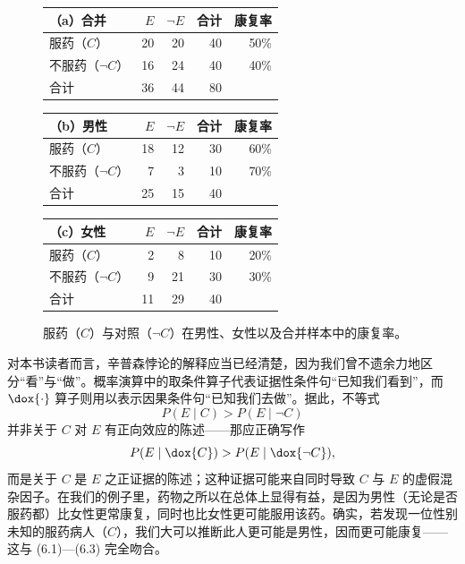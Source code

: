 \begin{figure}[htbp]
\centering
\begin{tabular}{@{}p{3.35cm} r r r r@{}}
\toprule
\textbf{（a）合并} & $E$ & $\neg E$ & 合计 & 康复率\\
\midrule
服药（$C$） & 20 & 20 & 40 & 50\%\\
不服药（$\neg C$） & 16 & 24 & 40 & 40\%\\
\midrule
合计 & 36 & 44 & 80 & \\
\bottomrule
\end{tabular}

\par\vspace{2.0em}
\begin{tabular}{@{}p{3.35cm} r r r r@{}}
\toprule
\textbf{（b）男性} & $E$ & $\neg E$ & 合计 & 康复率\\
\midrule
服药（$C$） & 18 & 12 & 30 & 60\%\\
不服药（$\neg C$） & 7 & 3 & 10 & 70\%\\
\midrule
合计 & 25 & 15 & 40 & \\
\bottomrule
\end{tabular}

\par\vspace{2.0em}
\begin{tabular}{@{}p{3.35cm} r r r r@{}}
\toprule
\textbf{（c）女性} & $E$ & $\neg E$ & 合计 & 康复率\\
\midrule
服药（$C$） & 2 & 8 & 10 & 20\%\\
不服药（$\neg C$） & 9 & 21 & 30 & 30\%\\
\midrule
合计 & 11 & 29 & 40 & \\
\bottomrule
\end{tabular}
\caption{服药（$C$）与对照（$\neg C$）在男性、女性以及合并样本中的康复率。}
\label{fig:6.1}
\end{figure}

对本书读者而言，辛普森悖论的解释应当已经清楚，因为我们曾不遗余力地区分“看”与“做”。概率演算中的取条件算子代表证据性条件句“已知我们看到”，而 $\dox{\cdot}$ 算子则用以表示因果条件句“已知我们去做”。据此，不等式
\[
P(E\mid C) > P(E\mid \neg C)
\]
并非关于 $C$ 对 $E$ 有正向效应的陈述——那应正确写作
\[
P(E\mid \dox{C}) > P(E\mid \dox{\neg C}),
\]
而是关于 $C$ 是 $E$ 之正证据的陈述；这种证据可能来自同时导致 $C$ 与 $E$ 的虚假混杂因子。在我们的例子里，药物之所以在总体上显得有益，是因为男性（无论是否服药都）比女性更常康复，同时也比女性更可能服用该药。确实，若发现一位性别未知的服药病人（$C$），我们大可以推断此人更可能是男性，因而更可能康复——这与 \textup{(6.1)}—\textup{(6.3)} 完全吻合。

